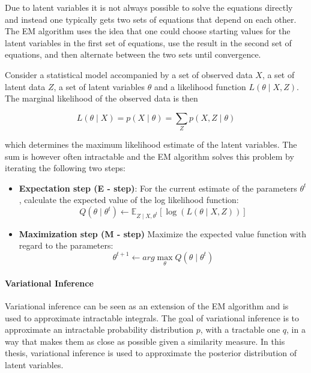 \documentclass[12pt]{report}
\begin{document}
Due to latent variables it is not always possible to solve the equations
directly and instead one typically gets two sets of equations that depend on
each other. The EM algorithm uses the idea that one could choose starting
values for the latent variables in the first set of equations, use the result
in the second set of equations, and then alternate between the two sets until
convergence.

Consider a statistical model accompanied by a set of observed data $X$, a set of
latent data $Z$, a set of latent variables $\theta$ and a likelihood function
$L(\theta \mid X, Z)$. The marginal likelihood of the observed data is then

\begin{equation}
L(\theta \mid X) = p(X \mid \theta) = \sum\limits_{Z} p(X, Z \mid \theta)
\end{equation}

which determines the maximum likelihood estimate of the latent variables. The
sum is however often intractable and the EM algorithm solves this problem by
iterating the following two steps:

\begin{itemize}
\item \textbf{Expectation step (E - step)}: For the current estimate of the parameters 
$\theta^t$, calculate the expected value of the log likelihood function:
\begin{equation}
Q(\theta \mid \theta^t) \leftarrow \mathbb{E}_{Z \mid X, \theta^t}
 [\log(L(\theta \mid X, Z))]
\end{equation}
\item \textbf{Maximization step (M - step)} Maximize the expected value function 
with regard to the parameters:
\begin{equation}
\theta^{t + 1} \leftarrow arg \max\limits_{\theta} Q(\theta \mid \theta^t)
\end{equation}
\end{itemize}

\paragraph{Variational Inference}

Variational inference can be seen as an extension of the EM algorithm and is
used to approximate intractable integrals. The goal of variational inference is
to approximate an intractable probability distribution $p$, with a tractable
one $q$, in a way that makes them as close as possible given a similarity
measure. In this thesis, variational inference is used to approximate the
posterior distribution of latent variables.
\end{document}
